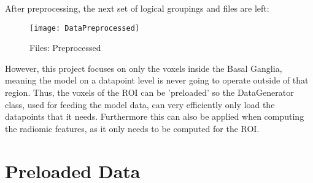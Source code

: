 After preprocessing, the next set of logical groupings and files are left:

\begin{figure}[H]
\centering
\texttt{[image: DataPreprocessed]}
\caption{Files: Preprocessed}
\end{figure}

However, this project focuses on only the voxels inside the Basal Ganglia, meaning the model on a datapoint level is never going to operate outside of that region. Thus, the voxels of the \ac{ROI} can be 'preloaded' so the DataGenerator class, used for feeding the model data, can very efficiently only load the datapoints that it needs. Furthermore this can also be applied when computing the radiomic features, as it only needs to be computed for the \ac{ROI}.

\section{Preloaded Data}




